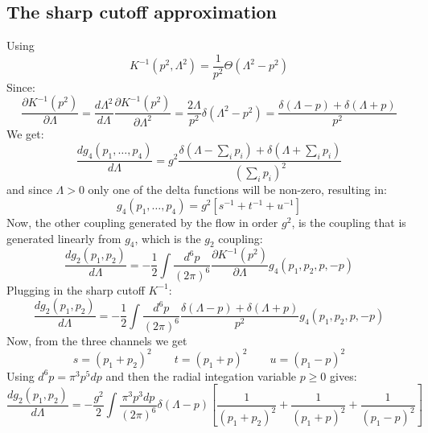 \documentclass{article}
\begin{document}
\subsection{The sharp cutoff approximation}
Using
\begin{equation}
    K^{-1}(p^2, \Lambda^2) = \frac{1}{p^2}\Theta(\Lambda^2 - p^2)
\end{equation}
Since:
\begin{equation}
    \frac{\partial K^{-1}(p^2)}{\partial\Lambda} = \frac{d\Lambda^2}{d\Lambda}\frac{\partial K^{-1}(p^2)}{\partial\Lambda^2} = \frac{2\Lambda}{p^2}\delta(\Lambda^2 - p^2) = \frac{\delta(\Lambda - p) + \delta(\Lambda + p)}{p^2}
\end{equation}
We get:
\begin{equation}
    \frac{dg_4(p_1, \dots, p_4)}{d\Lambda} = g^2 \frac{\delta(\Lambda - \sum_i p_i) + \delta(\Lambda + \sum_i p_i)}{\left(\sum_i p_i\right)^2}
\end{equation}
and since $\Lambda > 0$ only one of the delta functions will be non-zero, resulting in:
\begin{equation}
    g_4(p_1, \dots, p_4) = g^2 \left[s^{-1} + t^{-1} + u^{-1}\right]
\end{equation}
Now, the other coupling generated by the flow in order $g^2$, is the coupling that is generated linearly from $g_4$, which is the $g_2$ coupling:
\begin{equation}
    \frac{dg_2(p_1, p_2)}{d\Lambda} = - \frac{1}{2} \int \frac{d^6 p}{(2\pi)^6} \frac{\partial K^{-1}(p^2)}{\partial\Lambda} g_{4} (p_1, p_2, p, -p)
\end{equation}
Plugging in the sharp cutoff $K^{-1}$:
\begin{equation}
    \frac{dg_2(p_1, p_2)}{d\Lambda} = - \frac{1}{2} \int \frac{d^6 p}{(2\pi)^6} \frac{\delta(\Lambda - p) + \delta(\Lambda + p)}{p^2} g_{4} (p_1, p_2, p, -p)
\end{equation}
Now, from the three channels we get
\begin{equation}
    s = \left(p_1 + p_2\right)^2
    \qquad
    t = \left(p_1 + p\right)^2
    \qquad
    u = \left(p_1 - p\right)^2
\end{equation}
Using $d^6p = \pi^3 p^5 dp$ and then the radial integation variable $p \ge 0$ gives:
\begin{equation}
    \frac{dg_2(p_1, p_2)}{d\Lambda} = - \frac{g^2}{2} \int \frac{\pi^3 p^3 dp}{(2\pi)^6}\delta(\Lambda - p)\left[\frac{1}{\left(p_1 + p_2\right)^2} + \frac{1}{\left(p_1 + p\right)^2} + \frac{1}{\left(p_1 - p\right)^2}\right]
\end{equation}
\end{document}

